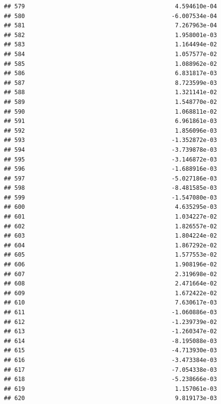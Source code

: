 \documentclass[
]{article}
\begin{document}
\begin{verbatim}
## 579                                           4.594610e-04
## 580                                          -6.007534e-04
## 581                                           7.267963e-04
## 582                                           1.958001e-03
## 583                                           1.164494e-02
## 584                                           1.057577e-02
## 585                                           1.088962e-02
## 586                                           6.831817e-03
## 587                                           8.723599e-03
## 588                                           1.321141e-02
## 589                                           1.548770e-02
## 590                                           1.068811e-02
## 591                                           6.961861e-03
## 592                                           1.856096e-03
## 593                                          -1.352872e-03
## 594                                          -3.739878e-03
## 595                                          -3.146872e-03
## 596                                          -1.688916e-03
## 597                                          -5.027186e-03
## 598                                          -8.481585e-03
## 599                                          -1.547080e-03
## 600                                           4.635295e-03
## 601                                           1.034227e-02
## 602                                           1.826557e-02
## 603                                           1.804224e-02
## 604                                           1.867292e-02
## 605                                           1.577553e-02
## 606                                           1.908196e-02
## 607                                           2.319698e-02
## 608                                           2.471664e-02
## 609                                           1.672422e-02
## 610                                           7.630617e-03
## 611                                          -1.060886e-03
## 612                                          -1.239739e-02
## 613                                          -1.260347e-02
## 614                                          -8.195088e-03
## 615                                          -4.713930e-03
## 616                                          -3.473384e-03
## 617                                          -7.054338e-03
## 618                                          -5.238666e-03
## 619                                           1.157061e-03
## 620                                           9.819173e-03

\end{verbatim}
\end{document}
